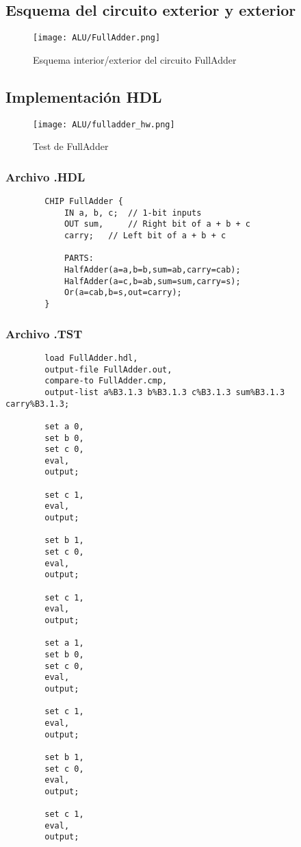 \documentclass[12pt]{article}
\begin{document}
	\subsection{Esquema del circuito exterior y exterior}
	\begin{figure}[H]
		\centering
		\texttt{[image: ALU/FullAdder.png]}
		\caption{Esquema interior/exterior del circuito FullAdder}
		\label{fig:f_adder}
	\end{figure}
	\subsection{Implementación HDL}
	\begin{figure}[H]
		\centering
		\texttt{[image: ALU/fulladder\_hw.png]}
		\caption{Test de FullAdder}
		\label{fig:enter-label}
	\end{figure}
	\subsubsection{Archivo .HDL}
	\begin{lstlisting}
		CHIP FullAdder {
			IN a, b, c;  // 1-bit inputs
			OUT sum,     // Right bit of a + b + c
			carry;   // Left bit of a + b + c

			PARTS:
			HalfAdder(a=a,b=b,sum=ab,carry=cab);
			HalfAdder(a=c,b=ab,sum=sum,carry=s);
			Or(a=cab,b=s,out=carry);
		}
	\end{lstlisting}
	\subsubsection{Archivo .TST}
	\begin{lstlisting}
		load FullAdder.hdl,
		output-file FullAdder.out,
		compare-to FullAdder.cmp,
		output-list a%B3.1.3 b%B3.1.3 c%B3.1.3 sum%B3.1.3 carry%B3.1.3;

		set a 0,
		set b 0,
		set c 0,
		eval,
		output;

		set c 1,
		eval,
		output;

		set b 1,
		set c 0,
		eval,
		output;

		set c 1,
		eval,
		output;

		set a 1,
		set b 0,
		set c 0,
		eval,
		output;

		set c 1,
		eval,
		output;

		set b 1,
		set c 0,
		eval,
		output;

		set c 1,
		eval,
		output;

	\end{lstlisting}
\end{document}
